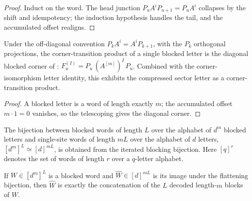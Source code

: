 \begin{proof}\leanok
    Induct on the word. The head junction $P_uA^iP_{u+1}=P_uA^i$ collapses by
    the shift and idempotency; the induction hypothesis handles the tail, and
    the accumulated offset realigns.
\end{proof}

\begin{lemma}
    \label{lem:periodic_cornerprod_blockdiag}
    \leanok
    Under the off-diagonal convention $P_kA^i=A^iP_{k+1}$, with the $P_k$
    orthogonal projections, the corner-transition product of a single blocked
    letter is the diagonal blocked corner of
    \cite[eq.~Cu]{DeLasCuevas2017Irreducible}:
    $F_u^{(I)}=P_u\,(A^{[m]})^I\,P_u$.
    Combined with the corner-isomorphism letter identity, this exhibits the
    compressed sector letter as a corner-transition product.
\end{lemma}

\begin{proof}\leanok
    A blocked letter is a word of length exactly $m$; the accumulated offset
    $m\cdot1=0$ vanishes, so the telescoping gives the diagonal corner.
\end{proof}

\begin{definition}
    \label{def:periodic_block_flatten_equiv}
    \leanok
    The bijection between blocked words of length $L$ over the alphabet of
    $d^m$ blocked letters and single-site words of length $mL$ over the alphabet
    of $d$ letters, $[d^m]^L\simeq[d]^{mL}$, is obtained from the iterated
    blocking bijection. Here $[q]^r$ denotes the set of words of length $r$
    over a $q$-letter alphabet.
\end{definition}

\begin{lemma}
    \label{lem:periodic_block_flatten_word_compat}
    \leanok
    If $W\in[d^m]^L$ is a blocked word and $\widehat W\in[d]^{mL}$ is its
    image under the flattening bijection, then $\widehat W$ is exactly the
    concatenation of the $L$ decoded length-$m$ blocks of $W$.
\end{lemma}

